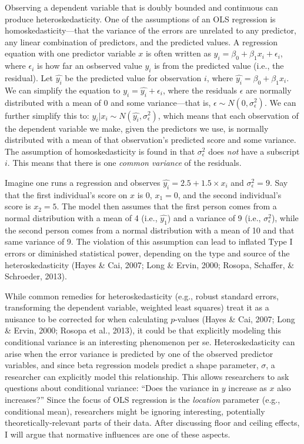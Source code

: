 \documentclass[english,man]{apa6}
\theoremstyle{definition}
\theoremstyle{definition}
\theoremstyle{remark}
\begin{document}
Observing a dependent variable that is doubly bounded and continuous can
produce heteroskedasticity. One of the assumptions of an OLS regression
is homoskedasticity---that the variance of the errors are unrelated to
any predictor, any linear combination of predictors, and the predicted
values. A regression equation with one predictor variable \(x\) is often
written as \(y_i = \beta_0 + \beta_1x_i + \epsilon_i\), where
\(\epsilon_i\) is how far an osbserved value \(y_i\) is from the
predicted value (i.e., the residual). Let \(\hat{y_i}\) be the predicted
value for observation \(i\), where \(\hat{y_i} = \beta_0 + \beta_1x_i\).
We can simplify the equation to \(y_i = \hat{y_i} + \epsilon_i\), where
the residuals \(\epsilon\) are normally distributed with a mean of 0 and
some variance---that is, \(\epsilon \sim N(0, \sigma^2_\epsilon)\). We
can further simplify this to:
\(y_i|x_i \sim N(\hat{y_i}, \sigma^2_\epsilon)\), which means that each
observation of the dependent variable we make, given the predictors we
use, is normally distributed with a mean of that observation's predicted
score and some variance. The assumption of homoskedasticity is found in
that \(\sigma^2_\epsilon\) does \emph{not} have a subscript \(i\). This
means that there is one \emph{common variance} of the residuals.

Imagine one runs a regression and observes
\(\hat{y_i} = 2.5 + 1.5 \times x_i\) and \(\sigma^2_\epsilon = 9\). Say
that the first individual's score on \(x\) is 0, \(x_1 = 0\), and the
second individual's score is \(x_2 = 5\). The model then assumes that
the first person comes from a normal distribution with a mean of 4
(i.e., \(\hat{y_1}\)) and a variance of 9 (i.e., \(\sigma^2_\epsilon\)),
while the second person comes from a normal distribution with a mean of
10 and that same variance of 9. The violation of this assumption can
lead to inflated Type I errors or diminished statistical power,
depending on the type and source of the heteroskedasticity (Hayes \&
Cai, 2007; Long \& Ervin, 2000; Rosopa, Schaffer, \& Schroeder, 2013).

While common remedies for heteroskedasticity (e.g., robust standard
errors, transforming the dependent variable, weighted least squares)
treat it as a nuisance to be corrected for when calculating \(p\)-values
(Hayes \& Cai, 2007; Long \& Ervin, 2000; Rosopa et al., 2013), it could
be that explicitly modeling this conditional variance is an interesting
phenomenon per se. Heteroskedasticity can arise when the error variance
is predicted by one of the observed predictor variables, and since beta
regression models predict a shape parameter, \(\sigma\), a researcher
can explicitly model this relationship. This allows researchers to ask
questions about conditional variance: \enquote{Does the variance in
\(y\) increase as \(x\) also increases?} Since the focus of OLS
regression is the \emph{location} parameter (e.g., conditional mean),
researchers might be ignoring interesting, potentially
theoretically-relevant parts of their data. After discussing floor and
ceiling effects, I will argue that normative influences are one of these
aspects.
\end{document}
